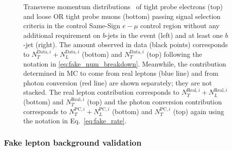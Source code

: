 \begin{figure}[ht!]
{}
\caption{Transverse momentum distributions \pt\ of tight probe 
electrons (top) and loose OR tight probe muons (bottom) passing signal 
selection criteria in the control Same-Sign $e-\mu$ control region 
without any additional requirement on $b$-jets in the event (left) and 
at least one $b$-jet (right). 
The amount observed in data (black points) corresponds 
to $N_T^{\textrm{Data},i}+N_L^{\textrm{Data},i}$ (bottom) and $N_T^{\textrm{Data},i}$ (top) following the notation
in \eqn\ref{eq:fake_num_breakdown}.
Meanwhile, the contribution determined in MC to come from 
real leptons (blue line) and from photon conversion (red line) are shown 
separately; they are not stacked. The real lepton contribution corresponds to 
$N_T^{\textrm{Real},i}+N_L^{\textrm{Real},i}$ (bottom) and $N_T^{\textrm{Real},i}$ 
(top) and the photon conversion 
contribution 
corresponds to $N_T^{\textrm{PC},i}+N_L^{\textrm{PC},i}$ (bottom) 
and $N_T^{\textrm{PC},i}$ (top) again using the notation 
in Eq.~\ref{eq:fake_rate}. }
\label{fig:fakeEff_CRs_electron}
\end{figure}


\subsubsection{Fake lepton background validation}



